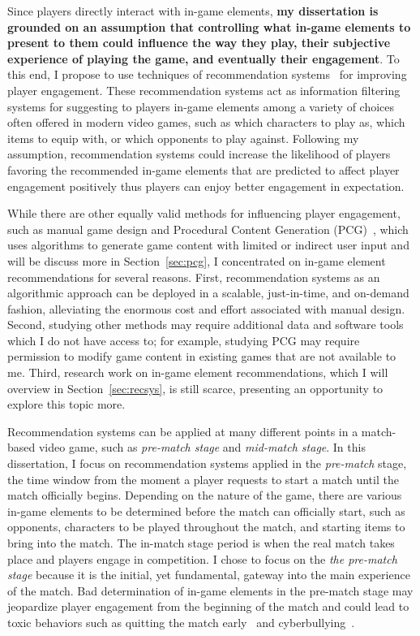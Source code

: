 Since players directly interact with in-game elements, \textbf{my dissertation is grounded on an assumption that controlling what in-game elements to present to them could influence the way they play, their subjective experience of playing the game, and eventually their engagement}. To this end, I propose to use techniques of recommendation systems~\citep{medler2011using} for improving player engagement. These recommendation systems act as information filtering systems for suggesting to players in-game elements among a variety of choices  often offered in modern video games, such as which characters to play as, which items to equip with, or which opponents to play against. Following my assumption, recommendation systems could increase the likelihood of players favoring the recommended in-game elements that are predicted to affect player engagement positively thus players can enjoy better engagement in expectation. 

While there are other equally valid methods for influencing player engagement, such as manual game design and Procedural Content Generation (PCG)~\citep{yannakakis2011experience,togelius2011search}, which uses algorithms to generate game content with limited or indirect user input and will be discuss more in Section~\ref{sec:pcg}, I concentrated on in-game element recommendations for several reasons. First, recommendation systems as an algorithmic approach can be deployed in a scalable, just-in-time, and on-demand fashion, alleviating the enormous cost and effort associated with manual design. Second, studying other methods may require additional data and software tools which I do not have access to; for example, studying PCG may require permission to modify game content in existing games that are not available to me. Third, research work on in-game element recommendations, which I will overview in Section~\ref{sec:recsys}, is still scarce, presenting an opportunity to explore this topic more. 

Recommendation systems can be applied at many different points in a match-based video game, such as \textit{pre-match stage} and \textit{mid-match stage}. In this dissertation, I focus on recommendation systems applied in the \textit{pre-match} stage, the time window from the moment a player requests to start a match until the match officially begins. Depending on the nature of the game, there are various in-game elements to be determined before the match can officially start, such as opponents, characters to be played throughout the match, and starting items to bring into the match. The in-match stage period is when the real match takes place and players engage in competition. I chose to focus on the \textit{the pre-match stage} because it is the initial, yet fundamental, gateway into the main experience of the match. Bad determination of in-game elements in the pre-match stage may jeopardize player engagement from the beginning of the match and could lead to toxic behaviors such as quitting the match early~\citep{shores2014identification} and cyberbullying~\citep{kwak2015exploring}. 

